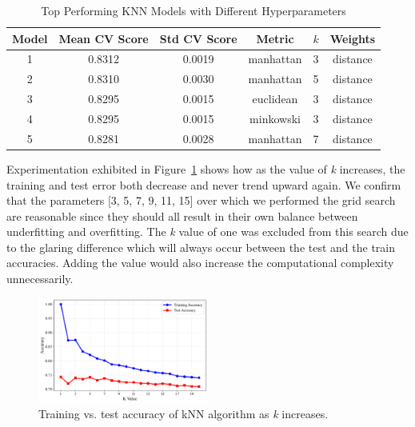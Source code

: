 \documentclass[10pt, conference]{IEEEtran}
\begin{document}
\begin{table}[htbp]
	\caption{Top Performing KNN Models with Different Hyperparameters}
	\centering
	\begin{tabular}{|c|c|c|c|c|c|}
		\hline
		\textbf{Model} & \textbf{Mean CV Score} & \textbf{Std CV Score} & \textbf{Metric} & \textbf{$k$} & \textbf{Weights} \\ \hline
		1 & 0.8312 & 0.0019 & manhattan & 3 & distance \\ \hline
		2 & 0.8310 & 0.0030 & manhattan & 5 & distance \\ \hline
		3 & 0.8295 & 0.0015 & euclidean & 3 & distance \\ \hline
		4 & 0.8295 & 0.0015 & minkowski & 3 & distance \\ \hline
		5 & 0.8281 & 0.0028 & manhattan & 7 & distance \\ \hline
	\end{tabular}
	\label{tab:knn_comparison}
\end{table}


Experimentation exhibited in Figure~\ref{fig:knn-perf} shows how as the value of \textit{k} increases, the training and test error both decrease and never trend upward again. We confirm that the parameters [3, 5, 7, 9, 11, 15] over which we performed the grid search are reasonable since they should all result in their own balance between underfitting and overfitting. The \textit{k} value of one was excluded from this search due to the glaring difference which will always occur between the test and the train accuracies. Adding the value would also increase the computational complexity unnecessarily.

\begin{figure}[htbp]
	\centering
	\includegraphics[width=0.5\textwidth]{../plots/knn_performance.pdf}
	\caption{Training vs. test accuracy of kNN algorithm as \textit{k} increases.}
	\label{fig:knn-perf}
\end{figure}
\end{document}
